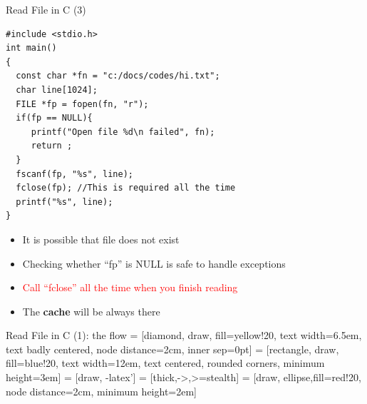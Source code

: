 \begin{frame}[fragile]{Read File in C (3)}
\vspace{-0.15in}
\begin{lstlisting}[xleftmargin=0.06\linewidth, linewidth=0.85\linewidth]
#include <stdio.h>
int main()
{
  const char *fn = "c:/docs/codes/hi.txt";
  char line[1024];
  FILE *fp = fopen(fn, "r");
  if(fp == NULL){
     printf("Open file %d\n failed", fn);
     return ;
  }  
  fscanf(fp, "%s", line);
  fclose(fp); //This is required all the time
  printf("%s", line);
}
\end{lstlisting}
\vspace{-0.2in}
\begin{itemize}
	\item {It is possible that file does not exist}
	\item {Checking whether ``fp'' is NULL is safe to handle exceptions}
	\item {\textcolor{red}{Call ``fclose'' all the time when you finish reading}}
	\item {The \textbf{cache} will be always there}
\end{itemize}
\end{frame}

\begin{frame}[fragile]{Read File in C (1): the flow}
 = [diamond, draw, fill=yellow!20, 
    text width=6.5em, text badly centered, node distance=2cm, inner sep=0pt]
 = [rectangle, draw, fill=blue!20, 
    text width=12em, text centered, rounded corners, minimum height=3em]
 = [draw, -latex']
 = [thick,->,>=stealth]
 = [draw, ellipse,fill=red!20, node distance=2cm,
    minimum height=2em]
\begin{center}


\end{center}
\end{frame}

